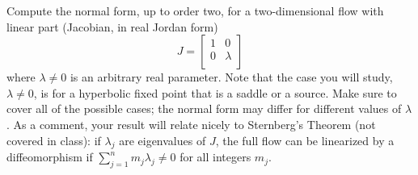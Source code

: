 \documentclass[12pt]{report}
\begin{document}
\begin{solution}
\begin{enumerate}
    \end{enumerate}
\end{solution}

\newpage



\begin{problem}
    Compute the normal form, up to order two, for a two-dimensional flow with linear part (Jacobian, in real Jordan form) $$
   J=
  \left[ {\begin{array}{cc}
   1 & 0 \\
   0 & \lambda \\
  \end{array} } \right] $$ where $\lambda \neq 0$ is an arbitrary real parameter.    Note that the case you will study, $\lambda \neq 0$, is for a hyperbolic fixed point that is a saddle or a source.  Make sure to cover all of the possible cases; the normal form may differ for different values of $\lambda$.  As a comment, your result will relate nicely to Sternberg's Theorem (not covered in class):  if $\lambda_j$ are eigenvalues of $J$, the full flow can be linearized by a diffeomorphism if $\sum_{j=1}^n m_j \lambda_j \neq 0$ for all integers $m_j$. 
\end{problem}
\end{document}
